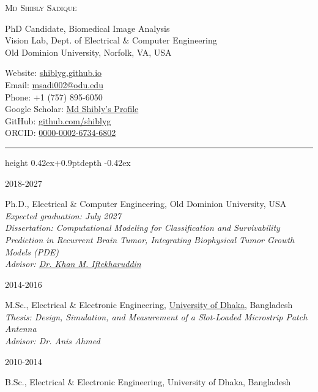 \documentclass[11pt,letterpaper]{article}
\newcommand{\spaced}[1]{\lsstyle #1}
\newcommand{\cvsection}[1]{%
  \needspace{4\baselineskip}%
  \vspace{13pt}%
  \noindent{\large\scshape\spaced{#1}}\hspace{7pt}%
  {\leaders\hrule height \dimexpr0.42ex+0.9pt\relax depth -0.42ex\hfill}\kern0pt%
  \par\vspace{6pt}}
\newcommand{\entry}[2]{%
  \needspace{3\baselineskip}%
  \noindent\begin{minipage}[t]{0.155\textwidth}\raggedright\small #1\end{minipage}%
  \hspace{0.015\textwidth}%
  \begin{minipage}[t]{0.825\textwidth}#2\end{minipage}\par\vspace{7pt}}
\begin{document}
\thispagestyle{firstpage}

{\LARGE\scshape\spaced{Md Shibly Sadique}}

\vspace{5pt}
\begin{minipage}[t]{0.52\textwidth}
PhD Candidate, Biomedical Image Analysis\\
Vision Lab, Dept. of Electrical \& Computer Engineering\\
Old Dominion University, Norfolk, VA, USA
\end{minipage}%
\hfill%
\begin{minipage}[t]{0.46\textwidth}\small\raggedleft
Website: \href{https://shiblyg.github.io}{shiblyg.github.io}\\
Email: \href{mailto:msadi002@odu.edu}{msadi002@odu.edu}\\
Phone: +1 (757) 895-6050\\
Google Scholar: \href{https://scholar.google.com/citations?user=EWnmhbgAAAAJ&hl=en}{Md Shibly's Profile}\\
GitHub: \href{https://github.com/shiblyg}{github.com/shiblyg}\\
ORCID: \href{https://orcid.org/0000-0002-6734-6802}{0000-0002-6734-6802}
\end{minipage}

\cvsection{Education}

\entry{2018-2027}{Ph.D., Electrical \& Computer Engineering, Old Dominion University, USA\\
\textit{Expected graduation: July 2027}\\
\textit{Dissertation: Computational Modeling for Classification and Survivability Prediction in Recurrent Brain Tumor, Integrating Biophysical Tumor Growth Models (PDE)}\\
\textit{Advisor: \href{https://sites.wp.odu.edu/VisionLab/people/\#Khan}{Dr. Khan M. Iftekharuddin}}}

\entry{2014-2016}{M.Sc., Electrical \& Electronic Engineering, \href{https://du.ac.bd/body/EEE}{University of Dhaka}, Bangladesh\\
\textit{Thesis: Design, Simulation, and Measurement of a Slot-Loaded Microstrip Patch Antenna}\\
\textit{Advisor: Dr. Anis Ahmed}}

\entry{2010-2014}{B.Sc., Electrical \& Electronic Engineering, University of Dhaka, Bangladesh}
\end{document}
